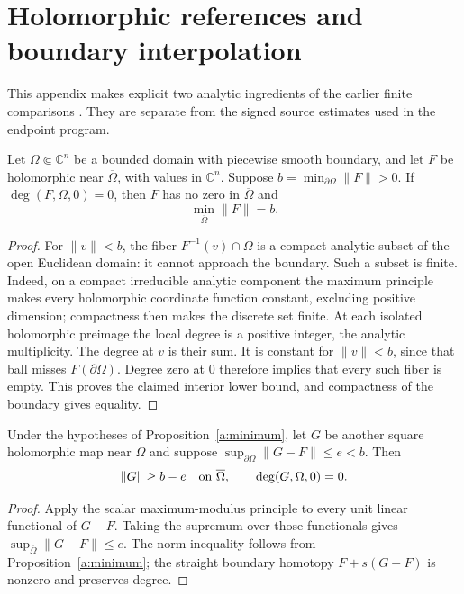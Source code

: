\appendix
\section{Holomorphic references and boundary interpolation}
\label{app:reference}

This appendix makes explicit two analytic ingredients of the earlier
finite comparisons \cite{note02}. They are separate from the signed
source estimates used in the endpoint program.

\begin{proposition}
\label{a:minimum}
Let $\Omega\Subset\mathbb C^n$ be a bounded domain with piecewise smooth
boundary, and let $F$ be holomorphic near $\overline\Omega$, with
values in $\mathbb C^n$. Suppose
$b=\min_{\partial\Omega}\|F\|>0$. If
$\deg(F,\Omega,0)=0$, then $F$ has no zero in $\overline\Omega$ and
\[
 \min_{\overline\Omega}\|F\|=b.
\]
\end{proposition}
\begin{proof}
For $\|v\|<b$, the fiber $F^{-1}(v)\cap\Omega$ is a compact analytic
subset of the open Euclidean domain: it cannot approach the boundary.
Such a subset is finite. Indeed, on a compact irreducible analytic
component the maximum principle makes every holomorphic coordinate
function constant, excluding positive dimension; compactness then
makes the discrete set finite. At each isolated holomorphic preimage
the local degree is a positive integer, the analytic multiplicity.
The degree at $v$ is their sum. It is constant for $\|v\|<b$, since
that ball misses $F(\partial\Omega)$. Degree zero at $0$ therefore
implies that every such fiber is empty. This proves the claimed
interior lower bound, and compactness of the boundary gives equality.
\end{proof}

\begin{corollary}
\label{a:transfer}
Under the hypotheses of Proposition~\ref{a:minimum}, let $G$ be another
square holomorphic map near $\overline\Omega$ and suppose
$\sup_{\partial\Omega}\|G-F\|\leq e<b$. Then
\[
 \|G\|\geq b-e\quad\hbox{on }\overline\Omega,
 \qquad \deg(G,\Omega,0)=0.
\]
\end{corollary}
\begin{proof}
Apply the scalar maximum-modulus principle to every unit linear
functional of $G-F$. Taking the supremum over those functionals gives
$\sup_{\overline\Omega}\|G-F\|\leq e$. The norm inequality follows
from Proposition~\ref{a:minimum}; the straight boundary homotopy
$F+s(G-F)$ is nonzero and preserves degree.
\end{proof}

